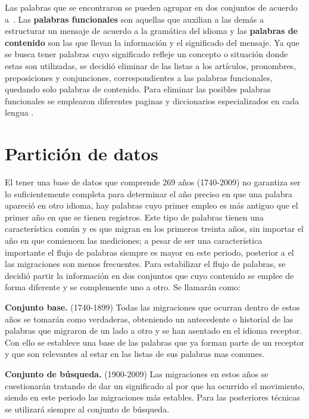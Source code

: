Las palabras que se encontraron se pueden agrupar en dos conjuntos de acuerdo
a~\cite{contenidopal}. Las \textbf{palabras funcionales} son aquellas que
auxilian a las demás a estructurar un mensaje de acuerdo a la gramática del
idioma y las \textbf{palabras de contenido} son las que llevan la información
y el significado del mensaje. Ya  que se busca tener palabras cuyo significado
refleje un concepto o situación donde estas son utilizadas, se decidió eliminar
de las listas a los artículos, pronombres, preposiciones y conjunciones,
correspondientes a las palabras funcionales, quedando solo palabras de
contenido. Para eliminar las posibles palabras funcionales se emplearon
diferentes paginas y diccionarios especializados en cada lengua
\cite{englishdic, frenchdic, germandic, italiandic, spanishdic}. 

\section{Partición de datos} %

El tener una base de datos que comprende 269 años (1740-2009) no garantiza ser
lo suficientemente completa para determinar el año preciso en que una palabra
apareció en otro idioma, hay palabras cuyo primer empleo es más antiguo que el
primer año en que se tienen registros. Este tipo de palabras tienen una
característica común y es que migran en los primeros treinta años, sin importar
el año en que comiencen las mediciones; a pesar de ser una característica
importante el flujo de palabras siempre es mayor en este periodo, posterior a
el las migraciones son menos frecuentes. Para estabilizar el flujo de palabras,
se decidió partir la información en dos conjuntos que cuyo contenido se emplee
de forma diferente y se complemente uno a otro.  Se llamarán como:

\textbf{Conjunto base.} (1740-1899) Todas las migraciones que ocurran dentro de
estos años se tomarán como verdaderas, obteniendo un antecedente o historial de
las palabras que migraron de un lado a otro y se han asentado en el idioma
receptor. Con ello se establece una base de las palabras que ya forman parte de
un receptor y que son relevantes al estar en las listas de sus palabras mas
comunes. 

\textbf{Conjunto de búsqueda.} (1900-2009) Las migraciones en estos años se
cuestionarán tratando de dar un significado al por que ha ocurrido el
movimiento,  siendo en este periodo las migraciones más estables. Para las
posteriores técnicas se utilizará siempre al conjunto de búsqueda.

